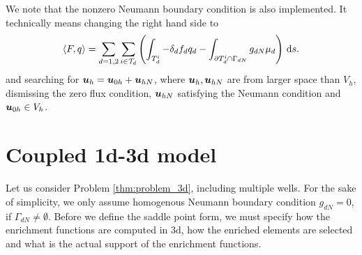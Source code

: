 We note that the nonzero Neumann boundary condition is also implemented.
It technically means changing the right hand side to
\begin{equation} \label{eqn:saddle_point_2d_nonzero_neumann}
 \langle F, q\rangle = \sum_{d=1,2}\sum_{i\in \mathcal T_d}\left(
        \int_{T_d^i} - \delta_d f_d q_d
        - \int_{\partial T_d^i\cap \Gamma_{dN}}
                 g_{dN} \mu_d\right) \,{\rm d} s.
\end{equation}
and searching for $\mathbf{\boldsymbol{u}}_h = \mathbf{\boldsymbol{u}}_{0h} + \mathbf{\boldsymbol{u}}_{hN}$,
where $\mathbf{\boldsymbol{u}}_h, \mathbf{\boldsymbol{u}}_{hN}$ are from larger space than $V_h$,
dismissing the zero flux condition, $\mathbf{\boldsymbol{u}}_{hN}$ satisfying the Neumann condition
and $\mathbf{\boldsymbol{u}}_{0h} \in V_h$.




\section{Coupled 1d-3d model}
\label{sec:coupled_13d}
Let us consider Problem \ref{thm:problem_3d}, including multiple wells.
For the sake of simplicity, we only assume homogenous Neumann boundary condition $g_{dN}=0$, if $\Gamma_{dN}\neq\emptyset$.
Before we define the saddle point form, we must specify how the enrichment functions are computed in 3d,
how the enriched elements are selected and what is the actual support of the enrichment functions.


